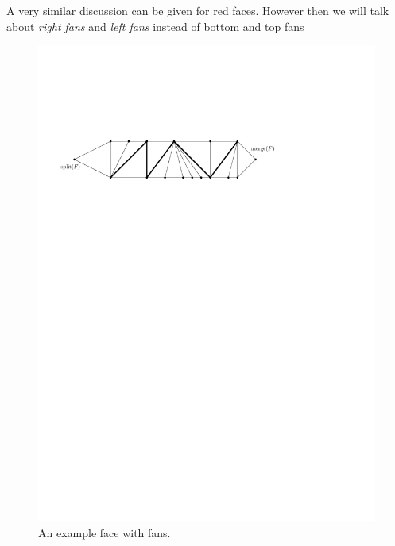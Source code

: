     A very similar discussion can be given for red faces. However then we will talk about \emph{right fans} and \emph{left fans} instead of bottom and top fans

     \begin{figure}[h]
       \centering
       \includegraphics[scale=.9]{rectangularDuals/img/fans}
       \caption{An example face with fans.}
       \label{fig:uni:fans}
     \end{figure}


